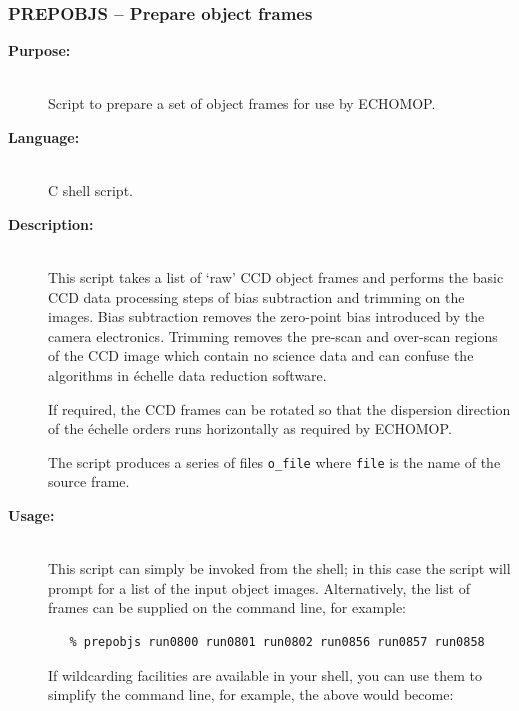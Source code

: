 \documentclass[twoside,11pt]{article}
\newcommand{\stardocinitials}  {SC}
\newcommand{\stardocnumber}    {3.2-0} %
\newcommand{\stardocname}{\stardocinitials /\stardocnumber}
\newcommand{\xref}[3]{#1}
\newcommand{\xlabel}[1]{}
\renewcommand{\_}{\texttt{\symbol{95}}}
\newcommand{\scspec}[2]{#1}
\newcommand{\scspec}[2]{#2}
\begin{document}
\newpage
\subsubsection{\label{se_prepobjs}\xlabel{prepobjs}PREPOBJS
                \scspec{--}{-} Prepare object frames}
\markboth{PREPOBJS}{\stardocname}

\begin{description}

\item [{\bf Purpose:}] \mbox{} \\
     Script to prepare a set of object frames for use by
     \xref{ECHOMOP}{sun152}{}.

\item [{\bf Language:}] \mbox{} \\
     C shell script.

\item [{\bf Description:}] \mbox{} \\
     This script takes a list of `raw' CCD object frames and performs
     the basic CCD data processing steps of bias subtraction and trimming
     on the images.  Bias subtraction removes the zero-point bias
     introduced by the camera electronics.  Trimming removes the pre-scan
     and over-scan regions of the CCD image which contain no science data
     and can confuse the algorithms in \'{e}chelle data reduction software.

     If required, the CCD frames can be rotated so that the dispersion
     direction of the \'{e}chelle orders runs horizontally as required by
     ECHOMOP.

     The script produces a series of files \verb+o_file+ where
     \verb+file+ is the name of the source frame.

\item [{\bf Usage:}] \mbox{} \\
     This script can simply be invoked from the shell; in this case
     the script will prompt for a list of the input object images.
     Alternatively, the list of frames can be supplied on the
     command line, for example:

\begin{verbatim}
   % prepobjs run0800 run0801 run0802 run0856 run0857 run0858
\end{verbatim}

     If wildcarding facilities are available in your shell, you can use
     them to simplify the command line, for example, the above would
     become:


\end{description}
\end{document}
